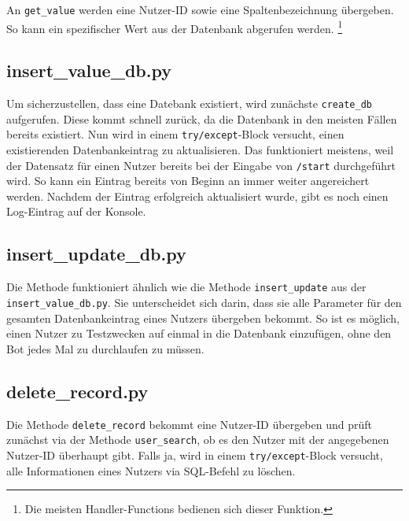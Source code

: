                 An \verb|get_value| werden eine Nutzer-ID sowie eine Spaltenbezeichnung übergeben. So kann ein spezifischer Wert aus der Datenbank abgerufen werden. \footnote{Die meisten Handler-Functions bedienen sich dieser Funktion.} 

        \subsection{insert\_value\_db.py} \label{insert_value_db.py}
                Um sicherzustellen, dass eine Datebank existiert, wird zunächste \verb|create_db| aufgerufen. Diese kommt schnell zurück, da die Datenbank in den meisten Fällen bereits existiert. Nun wird in einem \verb|try/except|-Block versucht, einen existierenden Datenbankeintrag zu aktualisieren. Das funktioniert meistens, weil der Datensatz für einen Nutzer bereits bei der Eingabe von \verb|/start| durchgeführt wird. So kann ein Eintrag bereits von Beginn an immer weiter angereichert werden. Nachdem der Eintrag erfolgreich aktualisiert wurde, gibt es noch einen Log-Eintrag auf der Konsole.  
        
        \subsection{insert\_update\_db.py} \label{insert_update_db.py}
                Die Methode funktioniert ähnlich wie die Methode \verb|insert_update| aus der \\\verb|insert_value_db.py|. Sie unterscheidet sich darin, dass sie alle Parameter für den gesamten Datenbankeintrag eines Nutzers übergeben bekommt. So ist es möglich, einen Nutzer zu Testzwecken auf einmal in die Datenbank einzufügen, ohne den Bot jedes Mal zu durchlaufen zu müssen.
        
        \subsection{delete\_record.py} \label{delete_record.py}
                Die Methode \verb|delete_record| bekommt eine Nutzer-ID übergeben und prüft zunächst via der Methode \verb|user_search|, ob es den Nutzer mit der angegebenen Nutzer-ID überhaupt gibt. Falls ja, wird in einem \verb|try/except|-Block versucht, alle Informationen eines Nutzers via SQL-Befehl zu löschen. 

